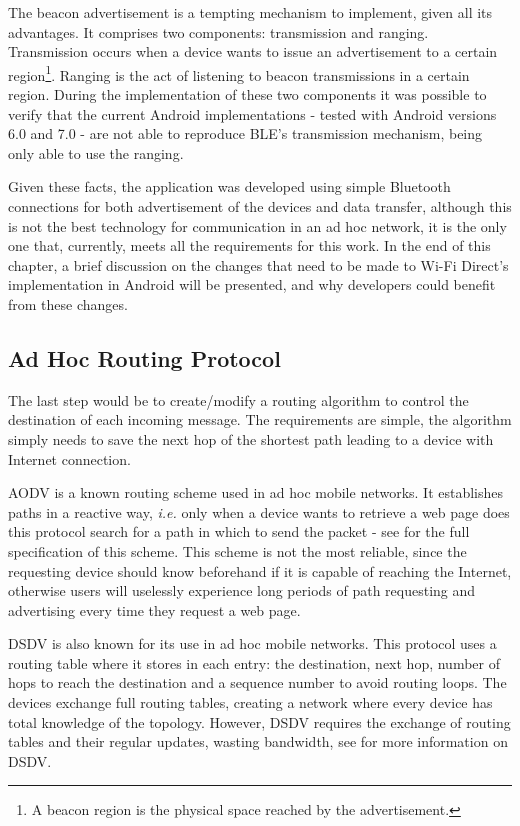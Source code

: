 The beacon advertisement is a tempting mechanism to implement, given all its advantages. It comprises two components: transmission and ranging. Transmission occurs when a device wants to issue an advertisement to a certain region\footnote{A beacon region is the physical space reached by the advertisement.}. Ranging is the act of listening to beacon transmissions in a certain region. During the implementation of these two components it was possible to verify that the current Android implementations - tested with Android versions 6.0 and 7.0 - are not able to reproduce \gls{BLE}'s transmission mechanism, being only able to use the ranging.

Given these facts, the application was developed using simple Bluetooth connections for both advertisement of the devices and data transfer, although this is not the best technology for communication in an ad hoc network, it is the only one that, currently, meets all the requirements for this work. In the end of this chapter, a brief discussion on the changes that need to be made to Wi-Fi Direct's implementation in Android will be presented, and why developers could benefit from these changes.

\subsection{Ad Hoc Routing Protocol}
\label{subsec:routprot}

The last step would be to create/modify a routing algorithm to control the destination of each incoming message. The requirements are simple, the algorithm simply needs to save the next hop of the shortest path leading to a device with Internet connection.

\gls{AODV} is a known routing scheme used in ad hoc mobile networks. It establishes paths in a reactive way, \textit{i.e.} only when a device wants to retrieve a web page does this protocol search for a path in which to send the packet - see \cite{aodv} for the full specification of this scheme. This scheme is not the most reliable, since the requesting device should know beforehand if it is capable of reaching the Internet, otherwise users will uselessly experience long periods of path requesting and advertising every time they request a web page.

\gls{DSDV} is also known for its use in ad hoc mobile networks. This protocol uses a routing table where it stores in each entry: the destination, next hop, number of hops to reach the destination and a sequence number to avoid routing loops. The devices exchange full routing tables, creating a network where every device has total knowledge of the topology. However, \gls{DSDV} requires the exchange of routing tables and their regular updates, wasting bandwidth, see \cite{dsdv} for more information on \gls{DSDV}.

